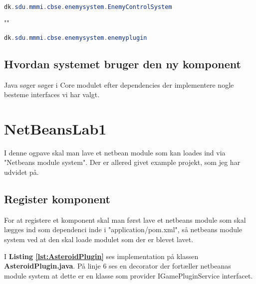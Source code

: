 \begin{lstlisting}[caption={dk.sdu.mmmi.cbse.common.services.IEntityProcessingService}, label={lst:App}, language=java]
dk.sdu.mmmi.cbse.enemysystem.EnemyControlSystem
\end{lstlisting}
""
\begin{lstlisting}[caption={dk.sdu.mmmi.cbse.common.services.igamepluginservice}, label={lst:app}, language=java]
dk.sdu.mmmi.cbse.enemysystem.enemyplugin
\end{lstlisting}


\subsection{Hvordan systemet bruger den ny komponent}
Java søger søger i Core modulet efter dependencies der implementere nogle
besteme interfaces vi har valgt.




\newpage
\section{NetBeansLab1}
I denne ogpave skal man lave et netbean module som kan loades ind via
"Netbeans module system". Der er allered givet example projekt, som jeg har
udvidet på.

\subsection{Register komponent}
For at registere et komponent skal man først lave et netbeans module som skal
lægges ind som dependenci inde i "application/pom.xml", så netbeans module
system ved at den skal loade modulet som der er blevet lavet.

\hfill \linebreak \hline 
{}
\hline \hfill \linebreak

I \textbf{Listing \ref{lst:AsteroidPlugin}} ses implementation på klassen
\textbf{AsteroidPlugin.java}. På linje 6 ses en decorator der fortæller netbeanas module 
system at dette er en klasse som provider IGamePluginService interfacet.

